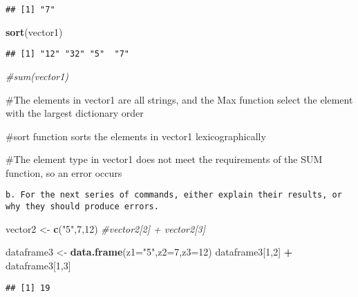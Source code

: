 \documentclass[
]{article}
\newenvironment{Shaded}{\begin{snugshade}}{\end{snugshade}}
\newcommand{\CommentTok}[1]{\textcolor[rgb]{0.56,0.35,0.01}{\textit{#1}}}
\newcommand{\DataTypeTok}[1]{\textcolor[rgb]{0.13,0.29,0.53}{#1}}
\newcommand{\DecValTok}[1]{\textcolor[rgb]{0.00,0.00,0.81}{#1}}
\newcommand{\KeywordTok}[1]{\textcolor[rgb]{0.13,0.29,0.53}{\textbf{#1}}}
\newcommand{\NormalTok}[1]{#1}
\newcommand{\OperatorTok}[1]{\textcolor[rgb]{0.81,0.36,0.00}{\textbf{#1}}}
\newcommand{\StringTok}[1]{\textcolor[rgb]{0.31,0.60,0.02}{#1}}
\begin{document}
\begin{verbatim}
## [1] "7"
\end{verbatim}

\begin{Shaded}
\begin{Highlighting}[]
\KeywordTok{sort}\NormalTok{(vector1)}
\end{Highlighting}
\end{Shaded}

\begin{verbatim}
## [1] "12" "32" "5"  "7"
\end{verbatim}

\begin{Shaded}
\begin{Highlighting}[]
\CommentTok{#sum(vector1)}
\end{Highlighting}
\end{Shaded}

\#The elements in vector1 are all strings, and the Max function select
the element with the largest dictionary order

\#sort function sorts the elements in vector1 lexicographically

\#The element type in vector1 does not meet the requirements of the SUM
function, so an error occurs

\begin{verbatim}
b. For the next series of commands, either explain their results, or why they should produce errors.
\end{verbatim}

\begin{Shaded}
\begin{Highlighting}[]
\NormalTok{vector2 <-}\StringTok{ }\KeywordTok{c}\NormalTok{(}\StringTok{"5"}\NormalTok{,}\DecValTok{7}\NormalTok{,}\DecValTok{12}\NormalTok{)}
\CommentTok{#vector2[2] + vector2[3]}

\NormalTok{dataframe3 <-}\StringTok{ }\KeywordTok{data.frame}\NormalTok{(}\DataTypeTok{z1=}\StringTok{"5"}\NormalTok{,}\DataTypeTok{z2=}\DecValTok{7}\NormalTok{,}\DataTypeTok{z3=}\DecValTok{12}\NormalTok{)}
\NormalTok{dataframe3[}\DecValTok{1}\NormalTok{,}\DecValTok{2}\NormalTok{] }\OperatorTok{+}\StringTok{ }\NormalTok{dataframe3[}\DecValTok{1}\NormalTok{,}\DecValTok{3}\NormalTok{]}
\end{Highlighting}
\end{Shaded}

\begin{verbatim}
## [1] 19
\end{verbatim}
\end{document}
